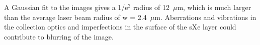 \documentclass[aps,pra,reprint,superscriptaddress]{revtex4-1}
\begin{document}

A Gaussian fit to the images gives a 1/e$^{2}$ radius of 12~$\mu$m, which is much larger than the average laser beam radius of w = 2.4~$\mu$m.  Aberrations and vibrations in the collection optics and imperfections in the surface of the sXe layer could contribute to blurring of the image.


\end{document}
